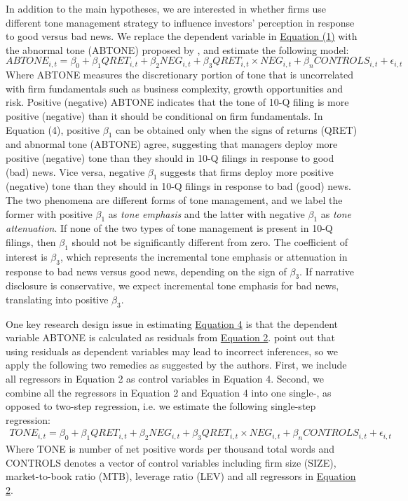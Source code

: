 \documentclass[a4paper]{article}
\begin{document}
\begin{spacing}{2}
In addition to the main hypotheses, we are interested in whether firms use different tone management strategy to influence investors' perception in response to good versus bad news. We replace the dependent variable in \hyperref[eq1]{Equation (1)} with the abnormal tone (ABTONE) proposed by \citet{huangToneManagement2014}, and estimate the following model:
\begin{equation} \label{eq4}
ABTONE_{i,t}=\beta_0+\beta_1QRET_{i,t}+\beta_2NEG_{i,t}+\beta_3QRET_{i,t}\times NEG_{i,t}+\beta_nCONTROLS_{i,t}+\epsilon_{i,t}
\end{equation}
Where ABTONE measures the discretionary portion of tone that is uncorrelated with firm fundamentals such as business complexity, growth opportunities and risk. Positive (negative) ABTONE indicates that the tone of 10-Q filing is more positive (negative) than it should be conditional on firm fundamentals. In Equation (4), positive $\beta_1$ can be obtained only when the signs of returns (QRET) and abnormal tone (ABTONE) agree, suggesting that managers deploy more positive (negative) tone than they should in 10-Q filings in response to good (bad) news. Vice versa, negative $\beta_1$ suggests that firms deploy more positive (negative) tone than they should in 10-Q filings in response to bad (good) news. The two phenomena are different forms of tone management, and we label the former with positive $\beta_1$ as \textit{tone emphasis} and the latter with negative $\beta_1$ as \textit{tone attenuation}. If none of the two types of tone management is present in 10-Q filings, then $\beta_1$ should not be significantly different from zero. The coefficient of interest is $\beta_3$, which represents the incremental tone emphasis or attenuation in response to bad news versus good news, depending on the sign of $\beta_3$. If narrative disclosure is conservative, we expect incremental tone emphasis for bad news, translating into positive $\beta_3$.

One key research design issue in estimating \hyperref[eq4]{Equation 4} is that the dependent variable ABTONE is calculated as residuals from \hyperref[eq2]{Equation 2}. \citet*{chenIncorrectInferencesWhen2018} point out that using residuals as dependent variables may lead to incorrect inferences, so we apply the following two remedies as suggested by the authors. First, we include all regressors in Equation 2 as control variables in Equation 4. Second, we combine all the regressors in Equation 2 and Equation 4 into one single-, as opposed to two-step regression, i.e. we estimate the following single-step regression:
\begin{equation} \label{eq5}
\begin{split}
TONE_{i,t}=\beta_0+\beta_1QRET_{i,t}+\beta_2NEG_{i,t}+\beta_3QRET_{i,t}\times NEG_{i,t}+\beta_nCONTROLS_{i,t}+\epsilon_{i,t}
\end{split}
\end{equation}
Where TONE is number of net positive words per thousand total words and CONTROLS denotes a vector of control variables including firm size (SIZE), market-to-book ratio (MTB), leverage ratio (LEV) and all regressors in \hyperref[eq2]{Equation 2}.


\end{spacing}
\end{document}
